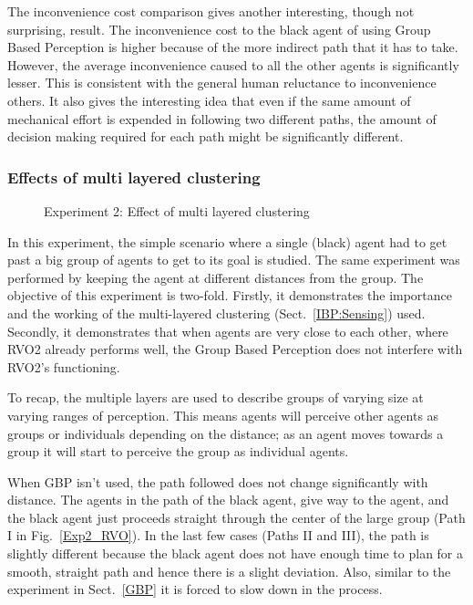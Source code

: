The inconvenience cost comparison gives another interesting, though not surprising, result. The inconvenience cost to the black agent of using Group Based Perception is higher because of the more indirect path that it has to take. However, the average inconvenience caused to all the other agents is significantly lesser. This is consistent with the general human reluctance to inconvenience others. It also gives the interesting idea that even if the same amount of mechanical effort is expended in following two different paths, the amount of decision making required for each path might be significantly different.

\subsubsection{Effects of multi layered clustering}

\begin{figure}[!t]
  \centering
   \hspace{1pt}
  \caption{Experiment 2: Effect of multi layered clustering}
  \label{Exp2}
\end{figure}

In this experiment, the simple scenario where a single (black) agent had to get past a big group of agents to get to its goal is studied. The same experiment was performed by keeping the agent at different distances from the group. The objective of this experiment is two-fold. Firstly, it demonstrates the importance and the working of the multi-layered clustering (Sect.~\ref{IBP:Sensing}) used. Secondly, it demonstrates that when agents are very close to each other, where RVO2 already performs well, the Group Based Perception does not interfere with RVO2's functioning.

To recap, the multiple layers are used to describe groups of varying size at varying ranges of perception. This means agents will perceive other agents as groups or individuals depending on the distance; as an agent moves towards a group it will start to perceive the group as individual agents.

When GBP isn't used, the path followed does not change significantly with distance. The agents in the path of the black agent, give way to the agent, and the black agent just proceeds straight through the center of the large group (Path I in Fig.~\ref{Exp2_RVO}). In the last few cases (Paths II and III), the path is slightly different because the black agent does not have enough time to plan for a smooth, straight path and hence there is a slight deviation. Also, similar to the experiment in Sect.~\ref{GBP} it is forced to slow down in the process.


